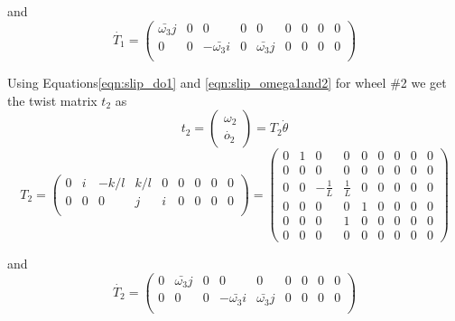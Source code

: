 {and 
\begin{equation}
\label{eqn:slip_dT1}
\dot{T_1}=\begin{pmatrix}
\bar{\omega_3}j & 0& 0& 0 & 0 &0 & 0 &0 &0\\
0 & 0& -\bar{\omega_3}i& 0 & \bar{\omega_3}j &0 & 0 &0 &0\\ 
\end{pmatrix}
\end{equation}

Using Equations\ref{eqn:slip_do1} and \ref{eqn:slip_omega1and2} for wheel \#2 we get the twist matrix $t_2$  as 
\begin{equation}
\label{eqn:slip_t2}
t_2=
\begin{pmatrix}
\omega_2\\
\dot{o_2}
\end{pmatrix}=T_2 \dot{\theta}
\end{equation} 
\begin{equation}
\label{eqn:slip_T2}
T_2=
\begin{pmatrix}
0 & i& -k/l & k/l & 0 &0 & 0 &0 &0\\
0 & 0& 0& j &i &0 & 0 &0 &0\\ 
\end{pmatrix}=
\left(
\begin{array}{ccccccccc}
0 & 1 & 0 & 0 & 0 & 0 & 0 & 0 & 0 \\
0 & 0 & 0 & 0 & 0 & 0 & 0 & 0 & 0 \\
0 & 0 & -\frac{1}{L} & \frac{1}{L} & 0 & 0 & 0 & 0 & 0 \\
0 & 0 & 0 & 0 & 1 & 0 & 0 & 0 & 0 \\
0 & 0 & 0 & 1 & 0 & 0 & 0 & 0 & 0 \\
0 & 0 & 0 & 0 & 0 & 0 & 0 & 0 & 0
\end{array}
\right)
\end{equation}

and 
\begin{equation}
\label{eqn:slip_dT2}
\dot{T_2}=\begin{pmatrix}
0 & \bar{\omega_3}j & 0& 0 & 0 &0 & 0 &0 &0\\
0 & 0& 0& -\bar{\omega_3}i & \bar{\omega_3}j &0 & 0 &0 &0\\ 
\end{pmatrix}
\end{equation}


}
